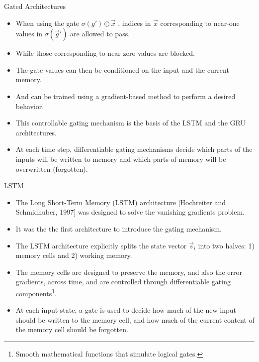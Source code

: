 \documentclass[handout]{beamer}
\begin{document}
\begin{frame}{Gated Architectures}
\begin{scriptsize}

\begin{itemize}
\item When using the gate $\sigma(g')\odot \vec{x}$ , indices in $\vec{x}$ corresponding to near-one values in $\sigma(\vec{g}')$ are allowed to pass.
\item While those corresponding to near-zero values are blocked. 
\item The gate values can then be conditioned on the input and the current memory.
\item And can be trained using a gradient-based method to perform a desired behavior.
\item This controllable gating mechanism is the basis of the LSTM and the GRU architectures.
\item At each time step, differentiable gating mechanisms decide which parts of the inputs will be written to memory and which parts of memory will be overwritten (forgotten). 
\end{itemize}
\end{scriptsize}
\end{frame}


\begin{frame}{LSTM}
\begin{scriptsize}

\begin{itemize}
\item The Long Short-Term Memory (LSTM) architecture [Hochreiter and Schmidhuber, 1997] was designed to solve the vanishing gradients problem.
\item It was the the first architecture to introduce the gating mechanism.
\item The LSTM architecture explicitly splits the state vector $\vec{s}_i$ into two halves: 1) memory cells and 2) working memory.
\item The memory cells are designed to preserve the memory, and also the error gradients, across time, and are controlled through differentiable gating components\footnote{Smooth mathematical functions that simulate logical gates.}.
\item At each input state, a gate is used to decide how much of the new input should be written to the memory cell, and how much of the current content of the memory cell should be forgotten.
\end{itemize}
\end{scriptsize}
\end{frame}
\end{document}
